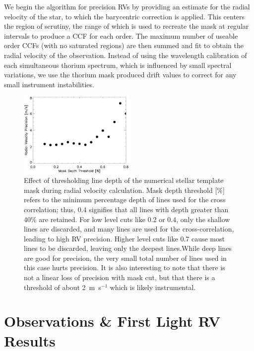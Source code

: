 \documentclass[12pt,preprint]{emulateapj}
\begin{document}
We begin the algorithm for precision RVs by providing an estimate for the radial velocity of the star, to which the barycentric correction is applied. This centers the region of scrutiny, the range of which is used to recreate the mask at regular intervals to produce a CCF for each order. The maximum number of useable order CCFs (with no saturated regions) are then summed and fit to obtain the radial velocity of the observation. Instead of using the wavelength calibration of each simultaneous thorium spectrum, which is influenced by small spectral variations, we use the thorium mask produced drift values to correct for any small instrument instabilities.

\begin{figure}[htbp] %
   \centering
   \includegraphics[width=0.5\textwidth]{maskcut_paper.eps} 
    \caption{Effect of thresholding line depth of the numerical stellar template mask during radial velocity calculation.
    Mask depth threshold [\%] refers to the minimum percentage depth of lines used for the cross correlation; thus, 
    0.4 signifies that all lines with depth greater than 40\% are retained. For low level cuts like 0.2 or 0.4, only the 
    shallow lines are discarded, and many lines are used for the cross-correlation, leading to high RV precision. Higher level 
    cuts like 0.7 cause most lines to be discarded, leaving only the deepest lines.While deep lines are good for precision,
    the very small total number of lines used in this case hurts precision. It is also interesting to note that there is not a 
    linear loss of precision with mask cut, but that there is a threshold of about 2~m~s$^{-1}$ which is likely instrumental.}
   \label{fig:maskcut}
\end{figure}

\section{Observations \& First Light RV Results}
\end{document}

